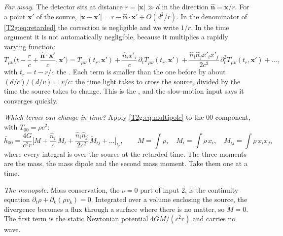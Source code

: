 \emph{Far away.} The detector sits at distance $r=\lvert\bm x\rvert\gg d$ in the direction $\hat{\bm n}=\bm x/r$. For a point $\bm x'$ of the source, $\lvert\bm x-\bm x'\rvert=r-\hat{\bm n}\cdot\bm x'+O(d^2/r)$. In the denominator of \eqref{T2g:eq:retarded} the correction is negligible and we write $1/r$. In the time argument it is not automatically negligible, because it multiplies a rapidly varying function:
\begin{equation}
  T_{\mu\nu}\Big(t-\frac rc+\frac{\hat{\bm n}\cdot\bm x'}{c},\bm x'\Big)
  =T_{\mu\nu}(t_r,\bm x')+\frac{\hat n_ix'_i}{c}\,\partial_tT_{\mu\nu}(t_r,\bm x')
  +\frac{\hat n_i\hat n_jx'_ix'_j}{2c^2}\,\partial_t^2T_{\mu\nu}(t_r,\bm x')+\dots,
  \label{T2g:eq:multipole}
\end{equation}
with $t_r=t-r/c$ the . Each term is smaller than the one before by about $(d/c)/(d/v)=v/c$: the time light takes to cross the source, divided by the time the source takes to change. This is the , and the slow-motion input says it converges quickly.

\emph{Which terms can change in time?} Apply \eqref{T2g:eq:multipole} to the $00$ component, with $T_{00}=\rho c^2$:
\begin{equation}
  \bar h_{00}=\frac{4G}{c^2r}\Big[M+\frac{\hat n_i}{c}\,\dot M_i+\frac{\hat n_i\hat n_j}{2c^2}\,\ddot M_{ij}+\dots\Big]_{t_r},
  \qquad M=\int\rho,\quad M_i=\int\rho\,x_i,\quad M_{ij}=\int\rho\,x_ix_j ,
  \label{T2g:eq:moments}
\end{equation}
where every integral is over the source at the retarded time. The three moments are the mass, the mass dipole and the second mass moment. Take them one at a time.

\emph{The monopole.} Mass conservation, the $\nu=0$ part of input 2, is the continuity equation $\partial_t\rho+\partial_k(\rho v_k)=0$. Integrated over a volume enclosing the source, the divergence becomes a flux through a surface where there is no matter, so $\dot M=0$. The first term is the static Newtonian potential $4GM/(c^2r)$ and carries no wave.

